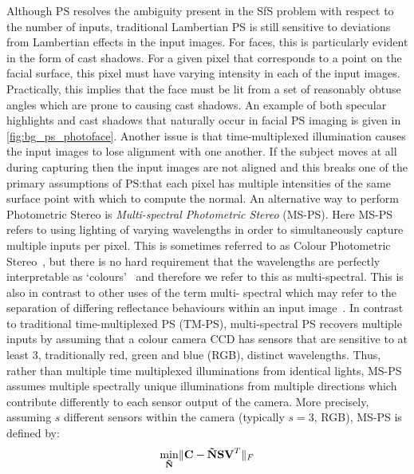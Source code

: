 Although PS resolves the ambiguity present in the SfS problem with respect
to the number of inputs, traditional Lambertian PS is still sensitive to
deviations from Lambertian effects in the input images. For faces, this
is particularly evident in the form of cast shadows. For a given pixel that
corresponds to a point on the facial surface, this pixel must have varying
intensity in each of the input images. Practically, this implies that the face
must be lit from a set of reasonably obtuse angles which are prone to causing
cast shadows. An example of both specular highlights and cast shadows that
naturally occur in facial PS imaging is given in \cref{fig:bg_ps_photoface}.
Another issue is that time-multiplexed illumination causes the input
images to lose alignment with one another. If the subject moves at all
during capturing then the input images are not aligned and this breaks
one of the primary assumptions of PS:\@ that each pixel has multiple intensities
of the same surface point with which to compute the normal. An alternative
way to perform Photometric Stereo is
\textit{Multi-spectral Photometric Stereo} (MS-PS). Here MS-PS refers to
using lighting of varying wavelengths in order to simultaneously capture
multiple inputs per pixel. This is sometimes referred to as 
Colour Photometric Stereo~\cite{petrov1987light,woodham1994gradient,%
kontsevich1994reconstruction,hernandez2007non}, 
but there is no hard requirement that the wavelengths are perfectly
interpretable as `colours'~\cite{fyffe2011single} and therefore we refer to this
as multi-spectral. This is also in contrast to other uses of the term multi-
spectral which may refer to the separation of differing reflectance behaviours
within an input image~\cite{nayar1997separation,mallick2005beyond,zickler2008color}.
In contrast to traditional time-multiplexed PS (TM-PS), multi-spectral PS
recovers multiple inputs by assuming that a colour camera CCD has sensors that
are sensitive to at least 3, traditionally red, green and blue (RGB), distinct 
wavelengths. Thus, rather than multiple time multiplexed illuminations from
identical lights, MS-PS assumes multiple spectrally unique illuminations from
multiple directions which contribute differently to each sensor output
of the camera. More precisely, assuming $s$ different sensors within the camera
(typically $s = 3$, RGB), MS-PS is defined by:
\begin{equation}\label{eg:bg_ps_lambertian_ms_ps}
	 \min_{\boldsymbol{\mathbf{\tilde{N}}}} \lVert \boldsymbol{\mathbf{C}} - \boldsymbol{\mathbf{\tilde{N}}} \boldsymbol{\mathbf{S}} \boldsymbol{\mathbf{V}}^T \rVert_F
\end{equation}
